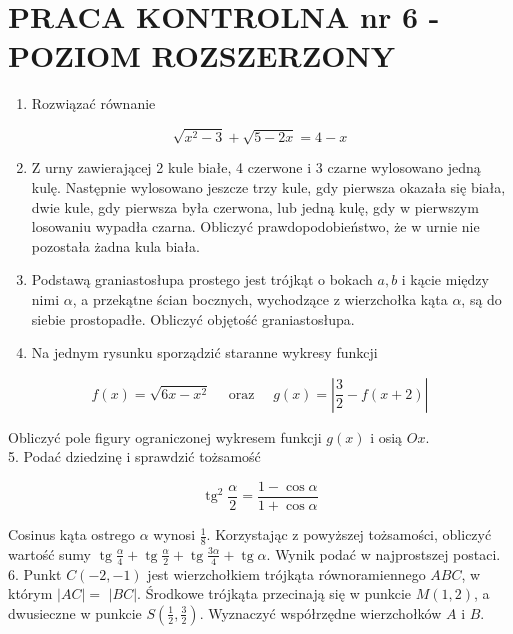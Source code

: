 \documentclass[10pt]{article}
\begin{document}
\section*{PRACA KONTROLNA nr 6 - POZIOM ROZSZERZONY}
\begin{enumerate}
  \item Rozwiązać równanie
\end{enumerate}

$$
\sqrt{x^{2}-3}+\sqrt{5-2 x}=4-x
$$

\begin{enumerate}
  \setcounter{enumi}{1}
  \item Z urny zawierającej 2 kule białe, 4 czerwone i 3 czarne wylosowano jedną kulę. Następnie wylosowano jeszcze trzy kule, gdy pierwsza okazała się biała, dwie kule, gdy pierwsza była czerwona, lub jedną kulę, gdy w pierwszym losowaniu wypadła czarna. Obliczyć prawdopodobieństwo, że w urnie nie pozostała żadna kula biała.
  \item Podstawą graniastosłupa prostego jest trójkąt o bokach $a, b$ i kącie między nimi $\alpha$, a przekątne ścian bocznych, wychodzące z wierzchołka kąta $\alpha$, są do siebie prostopadłe. Obliczyć objętość graniastosłupa.
  \item Na jednym rysunku sporządzić staranne wykresy funkcji
\end{enumerate}

$$
f(x)=\sqrt{6 x-x^{2}} \quad \text { oraz } \quad g(x)=\left|\frac{3}{2}-f(x+2)\right|
$$

Obliczyć pole figury ograniczonej wykresem funkcji $g(x)$ i osią $O x$.\\
5. Podać dziedzinę i sprawdzić tożsamość

$$
\operatorname{tg}^{2} \frac{\alpha}{2}=\frac{1-\cos \alpha}{1+\cos \alpha}
$$

Cosinus kąta ostrego $\alpha$ wynosi $\frac{1}{8}$. Korzystając z powyższej tożsamości, obliczyć wartość sumy $\operatorname{tg} \frac{\alpha}{4}+\operatorname{tg} \frac{\alpha}{2}+\operatorname{tg} \frac{3 \alpha}{4}+\operatorname{tg} \alpha$. Wynik podać w najprostszej postaci.\\
6. Punkt $C(-2,-1)$ jest wierzchołkiem trójkąta równoramiennego $A B C$, w którym $|A C|=$ $|B C|$. Środkowe trójkąta przecinają się w punkcie $M(1,2)$, a dwusieczne w punkcie $S\left(\frac{1}{2}, \frac{3}{2}\right)$. Wyznaczyć współrzędne wierzchołków $A$ i $B$.
\end{document}
